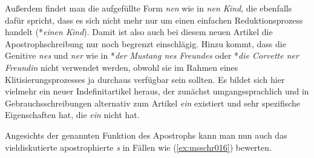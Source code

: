 \begin{exe}
  \ex\label{ex:msschr013} 
  \begin{xlist}
  \end{xlist}
\end{exe}

Außerdem findet man die aufgefüllte Form \textit{nen} wie in \textit{nen Kind}, die ebenfalls dafür spricht, dass es sich nicht mehr nur um einen einfachen Reduktionsprozess handelt (*\textit{einen Kind}).
Damit ist also auch bei diesem neuen Artikel die Apo\-stroph\-schrei\-bung nur noch begrenzt einschlägig.
Hinzu kommt, dass die Genitive \textit{nes} und \textit{ner} wie in *\textit{der Mustang nes Freundes} oder *\textit{die Corvette ner Freundin} nicht verwendet werden, obwohl sie im Rahmen eines Klitisierungsprozesses ja durchaus verfügbar sein sollten.
Es bildet sich hier vielmehr ein neuer Indefinitartikel heraus, der zunächst umgangssprachlich und in Gebrauchsschreibungen alternativ zum Artikel \textit{ein} existiert und sehr spezifische Eigenschaften hat, die \textit{ein} nicht hat.

Angesichts der genannten Funktion des Apostrophs kann man nun auch das vieldiskutierte apostrophierte \textit{s} in Fällen wie (\ref{ex:msschr016}) bewerten.

\begin{exe}
  \ex\label{ex:msschr016} 
  \begin{xlist}
  \end{xlist}
\end{exe}

